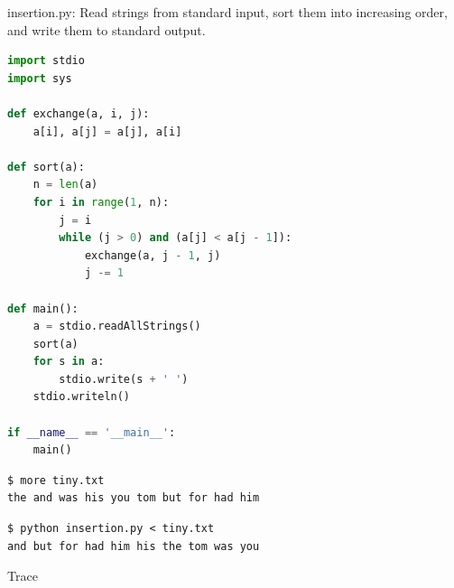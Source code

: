 \documentclass[8pt,a4paper,compress]{beamer}
\begin{document}
\begin{frame}[fragile]
\pause

\begin{framed}
\tiny insertion.py: Read strings from standard input, sort them into increasing order, and write them to standard output.
\end{framed}

\begin{lstlisting}[language=Python]
import stdio
import sys

def exchange(a, i, j):
    a[i], a[j] = a[j], a[i]

def sort(a):
    n = len(a)
    for i in range(1, n):
        j = i
        while (j > 0) and (a[j] < a[j - 1]):
            exchange(a, j - 1, j)
            j -= 1

def main():
    a = stdio.readAllStrings()
    sort(a)
    for s in a:
        stdio.write(s + ' ')
    stdio.writeln()

if __name__ == '__main__':
    main()
\end{lstlisting}

\pause

\begin{lstlisting}[language={}]
$ more tiny.txt 
the and was his you tom but for had him
\end{lstlisting}

\pause

\begin{lstlisting}[language={}]
$ python insertion.py < tiny.txt 
and but for had him his the tom was you 
\end{lstlisting}
\end{frame}

\begin{frame}[fragile]
\pause

Trace
\begin{center}
\end{center}
\end{frame}
\end{document}
